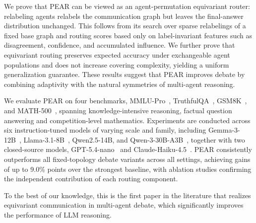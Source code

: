 We prove that PEAR can be viewed as an agent-permutation equivariant router: relabeling agents relabels the communication graph but leaves the final-answer distribution unchanged. This follows from its search over sparse relabelings of a fixed base graph and routing scores based only on label-invariant features such as disagreement, confidence, and accumulated influence. We further prove that equivariant routing preserves expected accuracy under exchangeable agent populations and does not increase covering complexity, yielding a uniform generalization guarantee. These results suggest that PEAR improves debate by combining adaptivity with the natural symmetries of multi-agent reasoning.






We evaluate PEAR on four benchmarks, MMLU-Pro~\cite{wang2024mmlu:mmlu-pro}, TruthfulQA~\cite{lin2022truthfulqa:truthfulqa}, GSM8K~\cite{cobbe2021training:gsm8k}, and MATH-500~\cite{hendrycks2021measuring:math500}, spanning knowledge-intensive reasoning, factual question answering and competition-level mathematics. Experiments are conducted across six instruction-tuned models of varying scale and family, including Gemma-3-12B~\cite{gemmateam2025gemma3technicalreport}, Llama-3.1-8B~\cite{grattafiori2024llama}, Qwen2.5-14B, and Qwen-3-30B-A3B~\cite{yang2025qwen3}, together with two closed-source models, GPT-5.4-nano~\cite{openai2026gpt54} and Claude-Haiku-4.5~\cite{anthropic2025haiku45}. PEAR consistently outperforms all fixed-topology debate variants across all settings, achieving gains of up to 9.0\% points over the strongest baseline, with ablation studies confirming the independent contribution of each routing component. 

To the best of our knowledge, this is the first paper in the literature that realizes equivariant communication in multi-agent debate, which significantly improves the performance of LLM reasoning.


